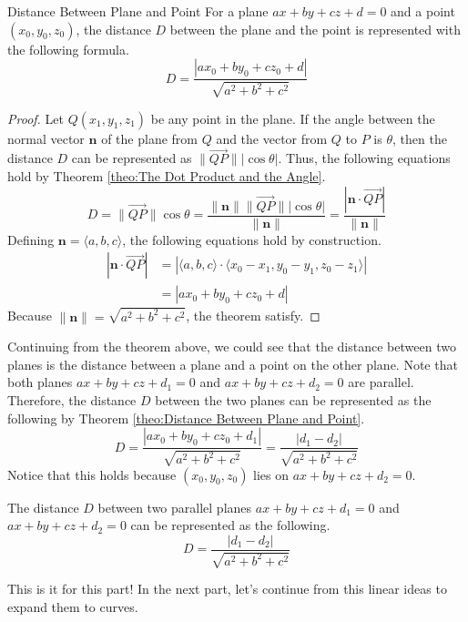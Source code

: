\documentclass[../../main.tex]{subfiles}
\begin{document}
\begin{theorem}{}{Distance Between Plane and Point}
For a plane $ax + by + cz + d = 0$ and a point $(x_0, y_0, z_0)$,
the distance $D$ between the plane and the point is represented with
the following formula.
\[
D
= \frac{| ax_0 + by_0 + cz_0 + d |}{\sqrt{a^2 + b^2 + c^2}}
\]
\end{theorem}
\begin{proof}
Let $Q(x_1, y_1, z_1)$ be any point in the plane. If the angle
between the normal vector $\mathbf{n}$ of the plane from $Q$ and
the vector from $Q$ to $P$ is $\theta$, then the distance $D$ can be
represented as $\| \vec{QP} \| |\cos\theta|$. Thus, the following
equations hold by Theorem \ref{theo:The Dot Product and the Angle}.
\[
D
= \| \vec{QP} \| \cos\theta
= \frac{\| \mathbf{n} \| \| \vec{QP} \| |\cos\theta|}{\| \mathbf{n} \|}
= \frac{| \mathbf{n} \cdot \vec{QP} |}{\| \mathbf{n} \|}
\]
Defining $\mathbf{n} = \langle a, b, c \rangle$, the following
equations hold by construction.
\begin{align*}
    | \mathbf{n} \cdot \vec{QP} |
    &= \left|
        \langle a, b, c \rangle \cdot
            \langle x_0 - x_1, y_0 - y_1, z_0 - z_1 \rangle
    \right| \\
    &= | ax_0 + by_0 + cz_0 + d |
\end{align*}
Because $\| \mathbf{n} \| = \sqrt{a^2 + b^2 + c^2}$, the theorem
satisfy.
\end{proof}

Continuing from the theorem above, we could see that the distance
between two planes is the distance between a plane and a point on
the other plane. Note that both planes $ax + by + cz + d_1 = 0$
and $ax + by + cz + d_2 = 0$ are parallel. Therefore, the distance
$D$ between the two planes can be represented as the following
by Theorem \ref{theo:Distance Between Plane and Point}.
\[
D
= \frac{| ax_0 + by_0 + cz_0 + d_1 |}{\sqrt{a^2 + b^2 + c^2}}
= \frac{| d_1 - d_2 |}{\sqrt{a^2 + b^2 + c^2}}
\]
Notice that this holds because $(x_0, y_0, z_0)$ lies on
$ax + by + cz + d_2 = 0$.

\begin{important}
The distance $D$ between two parallel planes $ax + by + cz + d_1 = 0$
and $ax + by + cz + d_2 = 0$ can be represented as the following.
\[
D
= \frac{| d_1 - d_2 |}{\sqrt{a^2 + b^2 + c^2}}
\]
\end{important}

This is it for this part! In the next part, let's continue from
this linear ideas to expand them to curves.
\end{document}
